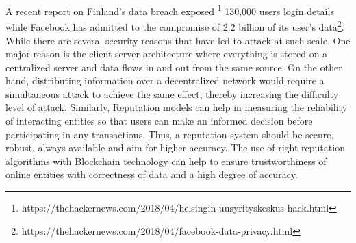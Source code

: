 A recent report on Finland's data breach exposed
\footnote{https://thehackernews.com/2018/04/helsingin-uusyrityskeskus-hack.html}
130,000 users login details while Facebook has admitted to the compromise of
2.2 billion of its user's
data\footnote{https://thehackernews.com/2018/04/facebook-data-privacy.html}.
While there are several security reasons that have led to attack at such scale.
One major reason is the client-server architecture where everything is stored
on a centralized server and data flows in and out from the same source. On the
other hand, distributing information over a decentralized network would require
a simultaneous attack to achieve the same effect, thereby increasing the
difficulty level of attack. Similarly, Reputation models can help in measuring
the reliability of interacting entities so that users can make an informed
decision before participating in any transactions. Thus, a reputation system
should be secure, robust, always available and aim for higher accuracy. The use
of right reputation algorithms with Blockchain technology can help to ensure
trustworthiness of online entities with correctness of data and a high degree
of accuracy.  



%


